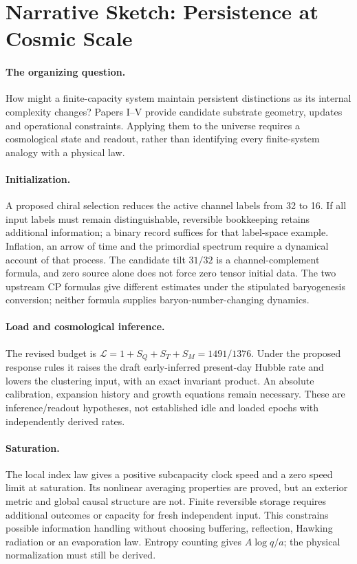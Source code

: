 \section*{Narrative Sketch: Persistence at Cosmic Scale}

\paragraph{The organizing question.}
How might a finite-capacity system maintain persistent distinctions as its internal complexity changes? Papers I--V provide candidate substrate geometry, updates and operational constraints. Applying them to the universe requires a cosmological state and readout, rather than identifying every finite-system analogy with a physical law.

\paragraph{Initialization.}
A proposed chiral selection reduces the active channel labels from 32 to 16. If all input labels must remain distinguishable, reversible bookkeeping retains additional information; a binary record suffices for that label-space example. Inflation, an arrow of time and the primordial spectrum require a dynamical account of that process. The candidate tilt $31/32$ is a channel-complement formula, and zero source alone does not force zero tensor initial data. The two upstream CP formulas give different estimates under the stipulated baryogenesis conversion; neither formula supplies baryon-number-changing dynamics.

\paragraph{Load and cosmological inference.}
The revised budget is $\mathcal L=1+S_Q+S_T+S_M=1491/1376$. Under the proposed response rules it raises the draft early-inferred present-day Hubble rate and lowers the clustering input, with an exact invariant product. An absolute calibration, expansion history and growth equations remain necessary. These are inference/readout hypotheses, not established idle and loaded epochs with independently derived rates.

\paragraph{Saturation.}
The local index law gives a positive subcapacity clock speed and a zero speed limit at saturation. Its nonlinear averaging properties are proved, but an exterior metric and global causal structure are not. Finite reversible storage requires additional outcomes or capacity for fresh independent input. This constrains possible information handling without choosing buffering, reflection, Hawking radiation or an evaporation law. Entropy counting gives $A\log q/a$; the physical normalization must still be derived.

